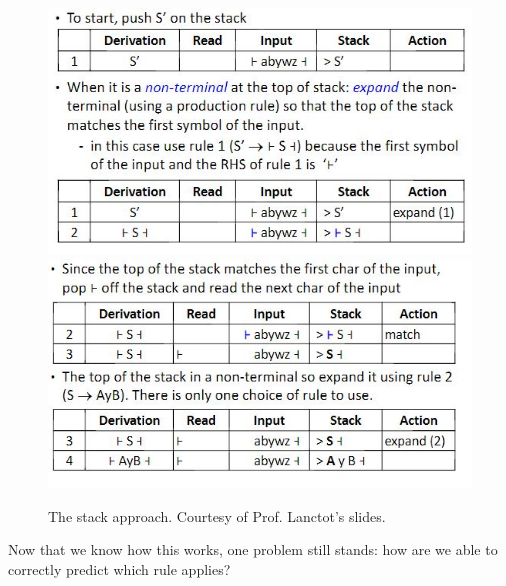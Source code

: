 \documentclass{report}
\begin{document}
\begin{figure}[ht]
\begin{center}
\includegraphics[scale=0.5]{ex1_1.jpg}
\includegraphics[scale=0.5]{ex1_2.jpg}
\end{center}
\caption{The stack approach. Courtesy of Prof. Lanctot's slides.}
\end{figure}
Now that we know how this works, one problem still stands: how are we able to correctly predict which rule applies? 
\end{document}
